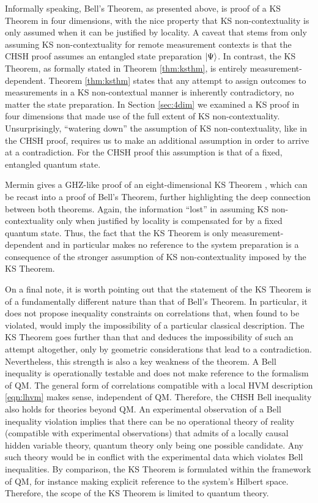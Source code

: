 Informally speaking, Bell's Theorem, as presented above, is proof of a KS Theorem in four dimensions, with the nice property that KS non-contextuality is only assumed when it can be justified by locality. A caveat that stems from only assuming KS non-contextuality for remote measurement contexts is that the CHSH proof assumes an entangled state preparation $\ket{\Psi}$. In contrast, the KS Theorem, as formally stated in Theorem \ref{thm:ksthm}, is entirely measurement-dependent. Theorem \ref{thm:ksthm} states that any attempt to assign outcomes to measurements in a KS non-contextual manner is inherently contradictory, no matter the state preparation. In Section \ref{sec:4dim} we examined a KS proof in four dimensions that made use of the full extent of KS non-contextuality. Unsurprisingly, “watering down” the assumption of KS non-contextuality, like in the CHSH proof, requires us to make an additional assumption in order to arrive at a contradiction. For the CHSH proof this assumption is that of a fixed, entangled quantum state. 

Mermin gives a GHZ-like proof of an eight-dimensional KS Theorem \cite{Mermin1993}, which can be recast into a proof of Bell's Theorem, further highlighting the deep connection between both theorems. Again, the information “lost” in assuming KS non-contextuality only when justified by locality is compensated for by a fixed quantum state. Thus, the fact that the KS Theorem is only measurement-dependent and in particular makes no reference to the system preparation is a consequence of the stronger assumption of KS non-contextuality imposed by the KS Theorem.

On a final note, it is worth pointing out that the statement of the KS Theorem is of a fundamentally different nature than that of Bell's Theorem. In particular, it does not propose inequality constraints on correlations that, when found to be violated, would imply the impossibility of a particular classical description. The KS Theorem goes further than that and deduces the impossibility of such an attempt altogether, only by geometric considerations that lead to a contradiction. Nevertheless, this strength is also a key weakness of the theorem. A Bell inequality is operationally testable and does not make reference to the formalism of QM. The general form of correlations compatible with a local HVM description \ref{eqn:lhvm} makes sense, independent of QM. Therefore, the CHSH Bell inequality also holds for theories beyond QM. An experimental observation of a Bell inequality violation implies that there can be no operational theory of reality (compatible with experimental observations) that admits of a locally causal hidden variable theory, quantum theory only being one possible candidate. Any such theory would be in conflict with the experimental data which violates Bell inequalities. By comparison, the KS Theorem is formulated within the framework of QM, for instance making explicit reference to the system's Hilbert space. Therefore, the scope of the KS Theorem is limited to quantum theory. 

